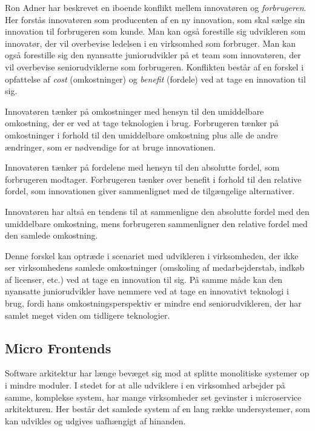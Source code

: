 \documentclass[]{article}
\begin{document}
Ron Adner har beskrevet en iboende konflikt mellem innovatøren og
\emph{forbrugeren}. Her forstås innovatøren som producenten af en ny
innovation, som skal sælge sin innovation til forbrugeren som kunde. Man
kan også forestille sig udvikleren som innovatør, der vil overbevise
ledelsen i en virksomhed som forbruger. Man kan også forestille sig den
nyansatte juniorudvikler på et team som innovatøren, der vil overbevise
seniorudviklerne som forbrugeren. Konflikten består af en forskel i
opfattelse af \emph{cost} (omkostninger) og \emph{benefit} (fordele) ved
at tage en innovation til sig.

Innovatøren tænker på omkostninger med hensyn til den umiddelbare
omkostning, der er ved at tage teknologien i brug. Forbrugeren tænker på
omkostninger i forhold til den umiddelbare omkostning plus alle de andre
ændringer, som er nødvendige for at bruge innovationen.

Innovatøren tænker på fordelene med hensyn til den absolutte fordel, som
forbrugeren modtager. Forbrugeren tænker over benefit i forhold til den
relative fordel, som innovationen giver sammenlignet med de tilgængelige
alternativer.

Innovatøren har altså en tendens til at sammenligne den absolutte fordel
med den umiddelbare omkostning, mens forbrugeren sammenligner den
relative fordel med den samlede omkostning.

Denne forskel kan optræde i scenariet med udvikleren i virksomheden, der
ikke ser virksomhedens samlede omkostninger (omskoling af
medarbejderstab, indkøb af licenser, etc.) ved at tage en innovation til
sig. På samme måde kan den nyansatte juniorudvikler have nemmere ved at
tage en innovativt teknologi i brug, fordi hans omkostningsperspektiv er
mindre end seniorudvikleren, der har samlet meget viden om tidligere
teknologier.

\hypertarget{micro-frontends}{%
\subsection{Micro Frontends}\label{micro-frontends}}

Software arkitektur har længe bevæget sig mod at splitte monolitiske
systemer op i mindre moduler. I stedet for at alle udviklere i en
virksomhed arbejder på samme, komplekse system, har mange virksomheder
set gevinster i microservice arkitekturen. Her består det samlede system
af en lang række undersystemer, som kan udvikles og udgives uafhængigt
af hinanden.
\end{document}
